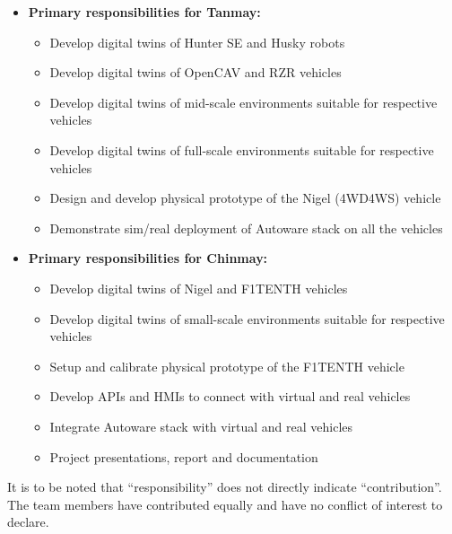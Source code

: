 \begin{itemize}
    \item \textbf{Primary responsibilities for Tanmay:}
    \begin{itemize}
    \item Develop digital twins of Hunter SE and Husky robots
    \item Develop digital twins of OpenCAV and RZR vehicles
    \item Develop digital twins of mid-scale environments suitable for respective vehicles
    \item Develop digital twins of full-scale environments suitable for respective vehicles
    \item Design and develop physical prototype of the Nigel (4WD4WS) vehicle
    \item Demonstrate sim/real deployment of Autoware stack on all the vehicles
    \end{itemize}
    
    \item \textbf{Primary responsibilities for Chinmay:}
    \begin{itemize}
    \item Develop digital twins of Nigel and F1TENTH vehicles
    \item Develop digital twins of small-scale environments suitable for respective vehicles
    \item Setup and calibrate physical prototype of the F1TENTH vehicle
    \item Develop APIs and HMIs to connect with virtual and real vehicles
    \item Integrate Autoware stack with virtual and real vehicles
    \item Project presentations, report and documentation
    \end{itemize}
\end{itemize}

It is to be noted that ``responsibility'' does not directly indicate ``contribution''. The team members have contributed equally and have no conflict of interest to declare.
